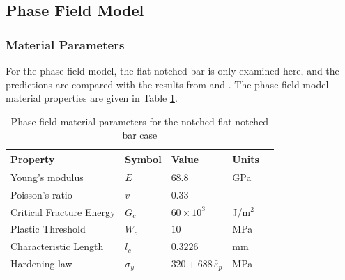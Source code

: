 \documentclass[sn-mathphys,Numbered]{sn-jnl}%
\begin{document}
\subsection{Phase Field Model}


\subsubsection{Material Parameters}
For the phase field model, the flat notched bar is only examined here, and the predictions are compared with the results from \citet{borden_phase-field_2016} and \citet{eldahshan_phase_2021}.
The phase field model material properties are given in Table \ref{table:FNB_material_properties_phaseField}.
\begin{table}[htb]
	\centering
		\begin{tabular}{lllll} \hline
			Property & Symbol & Value & Units  \\ \hline 
			Young's modulus & $E$ & $68.8$ & GPa \\
			Poisson's ratio & $v$ & $0.33$  & - \\
			Critical Fracture Energy & $G_c$ & $60\times10^3$ &  J/m$^2$ \\
			Plastic Threshold & $W_o$ & $10$ &  MPa \\
			Characteristic Length & $l_c$ & $0.3226$ &  mm    \\
			Hardening law & $\sigma_y$ & $320+688\, {\bar{\varepsilon}}_p$ &  MPa  \\
			\hline
		\end{tabular}
	\caption{Phase field material parameters for the notched flat notched bar case}
	\label{table:FNB_material_properties_phaseField}
\end{table}
\end{document}
